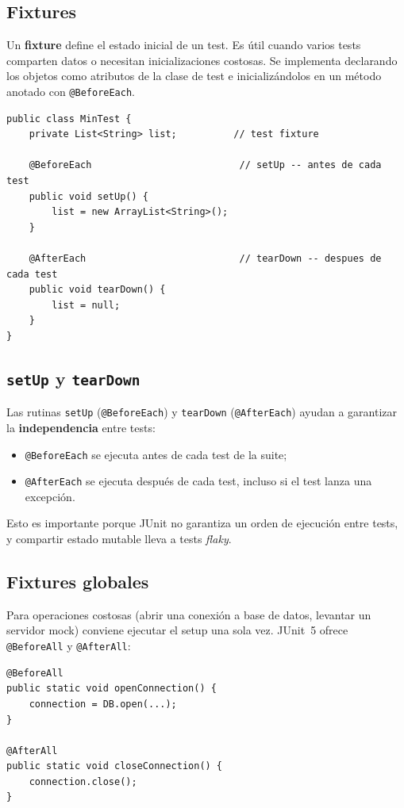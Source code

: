 \documentclass[12pt,a4paper]{article}
\begin{document}
\subsection{Fixtures}
Un \textbf{fixture} define el estado inicial de un test. Es útil cuando varios tests comparten datos o necesitan inicializaciones costosas. Se implementa declarando los objetos como atributos de la clase de test e inicializándolos en un método anotado con \texttt{@BeforeEach}.

\begin{lstlisting}[style=javastyle]
public class MinTest {
    private List<String> list;          // test fixture

    @BeforeEach                          // setUp -- antes de cada test
    public void setUp() {
        list = new ArrayList<String>();
    }

    @AfterEach                           // tearDown -- despues de cada test
    public void tearDown() {
        list = null;
    }
}
\end{lstlisting}

\subsection{\texttt{setUp} y \texttt{tearDown}}
Las rutinas \texttt{setUp} (\texttt{@BeforeEach}) y \texttt{tearDown} (\texttt{@AfterEach}) ayudan a garantizar la \textbf{independencia} entre tests:
\begin{itemize}
  \item \texttt{@BeforeEach} se ejecuta antes de cada test de la suite;
  \item \texttt{@AfterEach} se ejecuta después de cada test, incluso si el test lanza una excepción.
\end{itemize}
Esto es importante porque JUnit no garantiza un orden de ejecución entre tests, y compartir estado mutable lleva a tests \textit{flaky}.

\subsection{Fixtures globales}
Para operaciones costosas (abrir una conexión a base de datos, levantar un servidor mock) conviene ejecutar el setup una sola vez. JUnit~5 ofrece \texttt{@BeforeAll} y \texttt{@AfterAll}:
\begin{lstlisting}[style=javastyle]
@BeforeAll
public static void openConnection() {
    connection = DB.open(...);
}

@AfterAll
public static void closeConnection() {
    connection.close();
}
\end{lstlisting}
\end{document}
